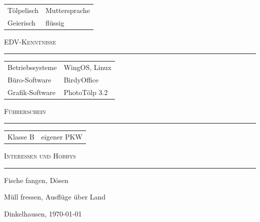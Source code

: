 \documentclass[11pt,a4paper,DIV=12]{scrartcl}
\begin{document}
\begin{longtable}{>{\raggedright \arraybackslash}p{2.8cm}
>{\raggedright \arraybackslash}p{11.5cm}}
	Tölpelisch & Muttersprache\\
	Geierisch & flüssig\\
\end{longtable}
\vspace*{0.3cm}


\textsc{EDV-Kenntnisse}\par
\noindent\rule[1ex]{\textwidth}{0.2pt}

\begin{longtable}{>{\raggedright \arraybackslash}p{2.8cm}
>{\raggedright \arraybackslash}p{11.5cm}}
Betriebssysteme		& 	WingOS, Linux\\
Büro-Software 		& 	BirdyOffice\\
Grafik-Software 	& 	PhotoTölp 3.2\\
\end{longtable}
\vspace*{0.3cm}

\newpage
\textsc{Führerschein}\par
\noindent\rule[1ex]{\textwidth}{0.2pt}

\begin{longtable}{>{\raggedright \arraybackslash}p{2.8cm}
>{\raggedright \arraybackslash}p{11.5cm}}
Klasse B & eigener PKW\\
\end{longtable}
\vspace*{0.3cm}

\textsc{Interessen und Hobbys}\par
\noindent\rule[1ex]{\textwidth}{0.2pt}

\begin{compactitem}
	\item Fische fangen, Dösen
	\item Müll fressen, Ausflüge über Land
\end{compactitem}
\vspace*{3cm}

Dinkelhausen, \today
\end{document}
